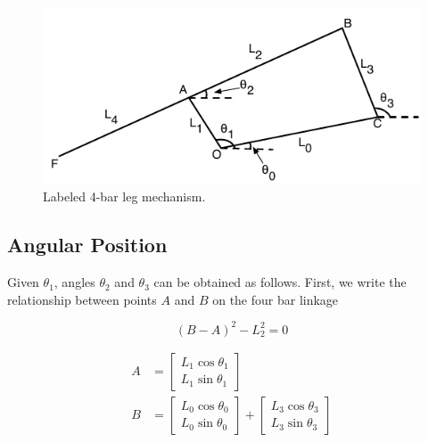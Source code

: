 \documentclass[letterpaper]{article}
\begin{document}
\begin{figure}[htb]
	\centering
	\includegraphics{4bar.pdf}
	\caption{Labeled 4-bar leg mechanism.}
	\label{fig:4bar}
\end{figure}

\subsection{Angular Position}
Given $\theta_1$, angles $\theta_2$ and $\theta_3$ can be obtained as follows. First, we write the relationship between points $A$ and $B$ on the four bar linkage

\begin{equation}
	(B - A)^2 - L_2^2 = 0
	\label{eq:BArel}
\end{equation}

\begin{align}
	A &= \begin{bmatrix} L_1 \cos \theta_1 \\ L_1 \sin \theta_1 \end{bmatrix}   \label{eq:Aloc}\\
	B &= \begin{bmatrix} L_0 \cos \theta_0 \\ L_0 \sin \theta_0 \end{bmatrix} 
			+ \begin{bmatrix} L_3 \cos \theta_3 \\ L_3 \sin \theta_3 \end{bmatrix} \label{eq:Bloc}
\end{align}
\end{document}
